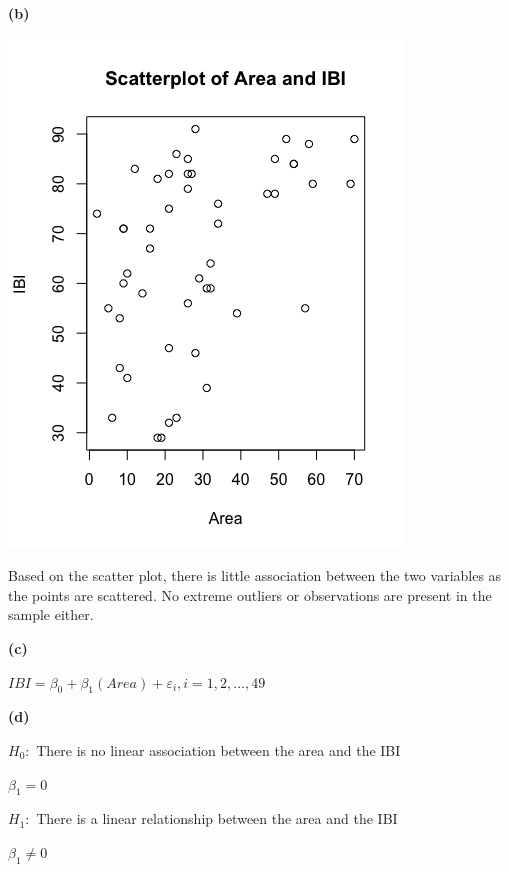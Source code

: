 \documentclass[11pt]{article}
\renewcommand\part[1]{\vspace{.10in}\textbf{(#1)}\par}
\begin{document}
	\part{b}
		\begin{center}
			\includegraphics[scale=0.5]{images/areaibiscatter.png}
		\end{center}\par
		
		Based on the scatter plot, there is little association between the two variables as the points are scattered. No extreme outliers or observations are present in the sample either.\par
	
	\part{c}
		$IBI = \beta_{0} + \beta_{1}(Area) + \varepsilon_{i}, i = 1, 2, ... , 49$\par
	
	\part{d}
		$H_{0}:$ There is no linear association between the area and the IBI\par
		$\beta_{1} = 0$\par
		$H_{1}:$ There is a linear relationship between the area and the IBI\par
		$\beta_{1} \ne 0$\par
		
\end{document}
